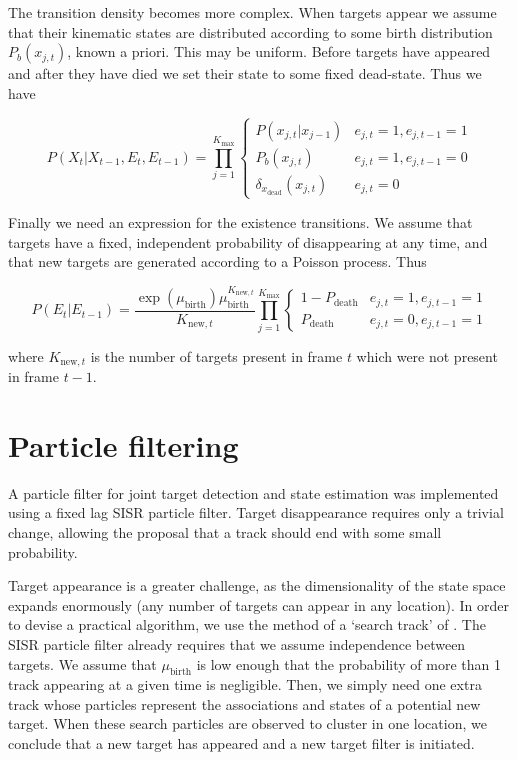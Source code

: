 The transition density becomes more complex. When targets appear we assume that their kinematic states are distributed according to some birth distribution $P_b(x_{j,t})$, known a priori. This may be uniform. Before targets have appeared and after they have died we set their state to some fixed dead-state. Thus we have

\begin{equation}
P(X_t|X_{t-1}, E_t, E_{t-1}) = \prod_{j=1}^{K_{\max}} \begin{cases} P(x_{j,t}|x_{j-1}) & e_{j,t} = 1, e_{j,t-1} = 1 \\ P_b(x_{j,t}) & e_{j,t} = 1, e_{j,t-1} = 0 \\ \delta_{x_{\text{dead}}}(x_{j,t}) & e_{j,t} = 0 \end{cases}
\label{eq:MTFactorisedTransitionWithE}
\end{equation}

Finally we need an expression for the existence transitions. We assume that targets have a fixed, independent probability of disappearing at any time, and that new targets are generated according to a Poisson process. Thus

\begin{equation}
P(E_t|E_{t-1}) = \frac{ \exp(\mu_{\text{birth}}) \mu_{\text{birth}}^{K_{\text{new},t}} }{ K_{\text{new},t} } \prod_{j=1}^{K_{\max}} \begin{cases} 1-P_{\text{death}} & e_{j,t} = 1, e_{j,t-1} = 1 \\ P_{\text{death}} & e_{j,t} = 0, e_{j,t-1} = 1 \end{cases}
\label{eq:MTExistenceTransition}
\end{equation}

where $K_{\text{new},t}$ is the number of targets present in frame $t$ which were not present in frame $t-1$.



\section{Particle filtering}
A particle filter for joint target detection and state estimation was implemented using a fixed lag SISR particle filter. Target disappearance requires only a trivial change, allowing the proposal that a track should end with some small probability.

Target appearance is a greater challenge, as the dimensionality of the state space expands enormously (any number of targets can appear in any location). In order to devise a practical algorithm, we use the method of a `search track' of \cite{Horridge2009}. The SISR particle filter already requires that we assume independence between targets. We assume that $\mu_{\text{birth}}$ is low enough that the probability of more than 1 track appearing at a given time is negligible. Then, we simply need one extra track whose particles represent the associations and states of a potential new target. When these search particles are observed to cluster in one location, we conclude that a new target has appeared and a new target filter is initiated.

